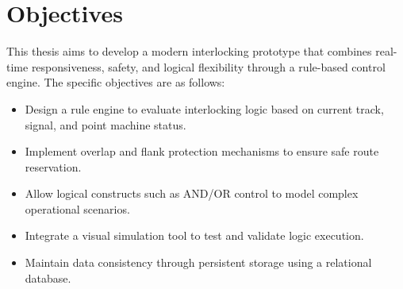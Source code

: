 \section{Objectives}
This thesis aims to develop a modern interlocking prototype that combines real-time responsiveness, safety, and logical flexibility through a rule-based control engine. The specific objectives are as follows:
\begin{itemize}
    \item Design a rule engine to evaluate interlocking logic based on current track, signal, and point machine status.
    \item Implement overlap and flank protection mechanisms to ensure safe route reservation.
    \item Allow logical constructs such as AND/OR control to model complex operational scenarios.
    \item Integrate a visual simulation tool to test and validate logic execution.
    \item Maintain data consistency through persistent storage using a relational database.
\end{itemize}